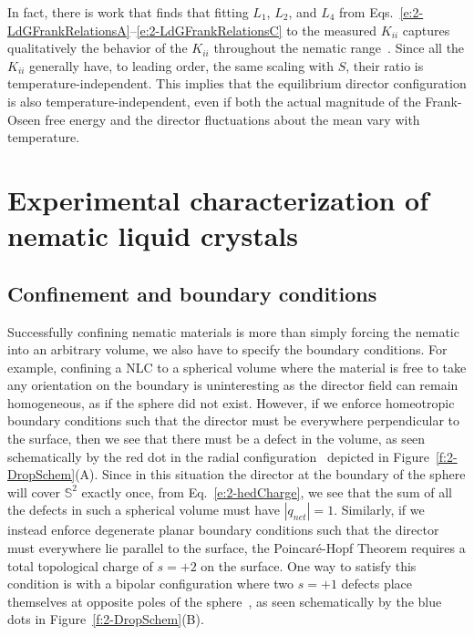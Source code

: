 In fact, there is work that finds that fitting $L_1$, $L_2$, and $L_4$ from Eqs.~\ref{e:2-LdGFrankRelationsA}--\ref{e:2-LdGFrankRelationsC} to the measured $K_{ii}$ captures qualitatively the behavior of the $K_{ii}$ throughout the nematic range~\cite{RN198}.
Since all the $K_{ii}$ generally have, to leading order, the same scaling with $S$, their ratio is temperature-independent.
This implies that the equilibrium director configuration is also temperature-independent, even if both the actual magnitude of the Frank-Oseen free energy and the director fluctuations about the mean vary with temperature.




\section{Experimental characterization of nematic liquid crystals}
\subsection{Confinement and boundary conditions}
Successfully confining nematic materials is more than simply forcing the nematic into an arbitrary volume, we also have to specify the boundary conditions.
For example, confining a NLC to a spherical volume where the material is free to take any orientation on the boundary is uninteresting as the director field can remain homogeneous, as if the sphere did not exist.
However, if we enforce homeotropic boundary conditions such that the director must be everywhere perpendicular to the surface, then we see that there must be a defect in the volume, as seen schematically by the red dot in the radial configuration~\cite{RN177} depicted in Figure~\ref{f:2-DropSchem}(A).
Since in this situation the director at the boundary of the sphere will cover $\mathbb{S}^2$ exactly once, from Eq.~\ref{e:2-hedCharge}, we see that the sum of all the defects in such a spherical volume must have $|q_{net}| = 1$.
Similarly, if we instead enforce degenerate planar boundary conditions such that the director must everywhere lie parallel to the surface, the Poincar\'e-Hopf Theorem requires a total topological charge of $s = +2$ on the surface.
One way to satisfy this condition is with a bipolar configuration where two $s = +1$ defects place themselves at opposite poles of the sphere~\cite{RN177}, as seen schematically by the blue dots in Figure~\ref{f:2-DropSchem}(B).

